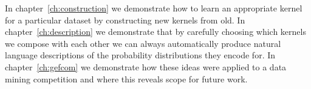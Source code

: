 In chapter~\ref{ch:construction} we demonstrate how to learn an appropriate kernel for a particular dataset by constructing new kernels from old.
In chapter~\ref{ch:description} we demonstrate that by carefully choosing which kernels we compose with each other we can always automatically produce natural language descriptions of the probability distributions they encode for.
In chapter~\ref{ch:gefcom} we demonstrate how these ideas were applied to a data mining competition and where this reveals scope for future work.

\outbpdocument{


}


